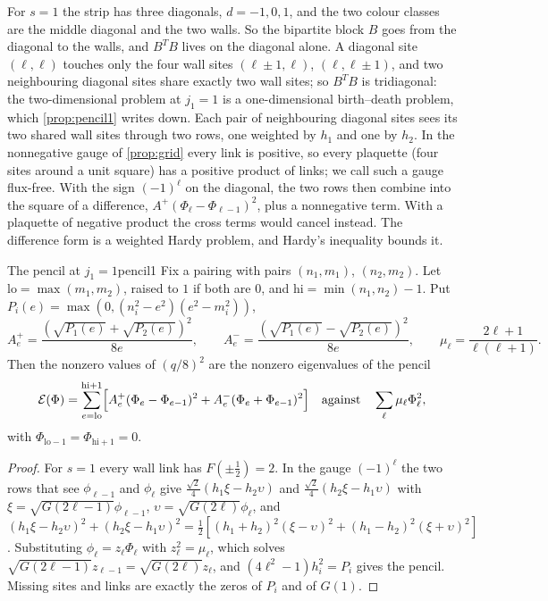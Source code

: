 For $s=1$ the strip has three diagonals, $d=-1,0,1$, and the two colour classes are the
middle diagonal and the two walls. So the bipartite block $B$ goes from the diagonal
to the walls, and $B^TB$ lives on the diagonal alone. A diagonal site $(\ell,\ell)$
touches only the four wall sites $(\ell\pm1,\ell)$, $(\ell,\ell\pm1)$, and two
neighbouring diagonal sites share exactly two wall sites; so $B^TB$ is tridiagonal: the
two-dimensional problem at $j_1=1$ is a one-dimensional birth--death problem, which
\cref{prop:pencil1} writes down. Each pair of neighbouring diagonal sites sees its two
shared wall sites through two rows, one weighted by $h_1$ and one by $h_2$. In the
nonnegative gauge of \cref{prop:grid} every link is positive, so every plaquette (four
sites around a unit square) has a positive product of links; we call such a gauge
flux-free. With the sign $(-1)^\ell$ on the diagonal, the two rows then combine into
the square of a difference, $A^+(\Phi_\ell-\Phi_{\ell-1})^2$, plus a nonnegative term.
With a plaquette of negative product the cross terms would cancel instead. The
difference form is a weighted Hardy problem, and Hardy's inequality bounds it.

\begin{proposition}{The pencil at \texorpdfstring{$j_1=1$}{j1 = 1}}{pencil1}
Fix a pairing with pairs $(n_1,m_1)$, $(n_2,m_2)$. Let $\mathrm{lo}=\max(m_1,m_2)$, raised
to $1$ if both are $0$, and $\mathrm{hi}=\min(n_1,n_2)-1$. Put
$P_i(e)=\max(0,(n_i^2-e^2)(e^2-m_i^2))$,
\[
  A^+_e=\frac{(\sqrt{P_1(e)}+\sqrt{P_2(e)})^2}{8e},\qquad
  A^-_e=\frac{(\sqrt{P_1(e)}-\sqrt{P_2(e)})^2}{8e},\qquad \mu_\ell=\frac{2\ell+1}{\ell(\ell+1)}.
\]
Then the nonzero values of $(q/8)^2$ are the nonzero eigenvalues of the pencil
\[
  \mathcal E(\Phi)=\sum_{e=\mathrm{lo}}^{\mathrm{hi}+1}\Bigl[A^+_e(\Phi_e-\Phi_{e-1})^2+A^-_e(\Phi_e+\Phi_{e-1})^2\Bigr]
  \quad\text{against}\quad\sum_\ell\mu_\ell\Phi_\ell^2,
\]
with $\Phi_{\mathrm{lo}-1}=\Phi_{\mathrm{hi}+1}=0$.
\end{proposition}

\begin{proof}
For $s=1$ every wall link has $F(\pm\frac12)=2$. In the gauge $(-1)^\ell$ the two rows
that see $\phi_{\ell-1}$ and $\phi_\ell$ give $\frac{\sqrt2}4(h_1\xi-h_2\upsilon)$ and
$\frac{\sqrt2}4(h_2\xi-h_1\upsilon)$ with $\xi=\sqrt{G(2\ell-1)}\phi_{\ell-1}$, $\upsilon=\sqrt{G(2\ell)}
\phi_\ell$, and $(h_1\xi-h_2\upsilon)^2+(h_2\xi-h_1\upsilon)^2=\frac12[(h_1+h_2)^2(\xi-\upsilon)^2+(h_1-h_2)^2(\xi+\upsilon)^2]$.
Substituting $\phi_\ell=z_\ell\Phi_\ell$ with $z_\ell^2=\mu_\ell$, which solves
$\sqrt{G(2\ell-1)}z_{\ell-1}=\sqrt{G(2\ell)}z_\ell$, and $(4\ell^2-1)h_i^2=P_i$ gives the
pencil. Missing sites and links are exactly the zeros of $P_i$ and of $G(1)$.
\end{proof}

